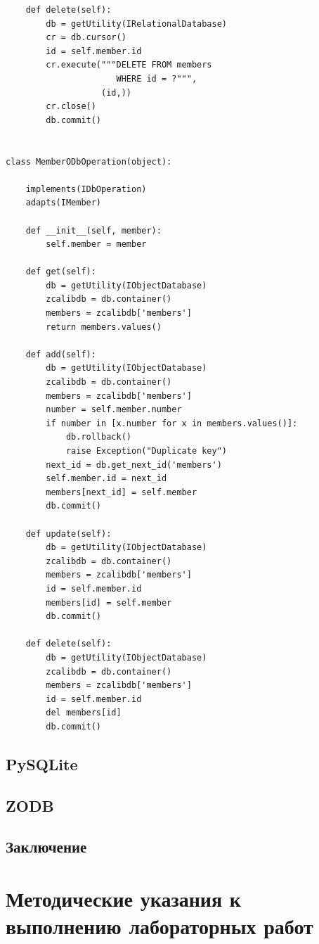 \documentclass[a4paper,openany,twoside,final]{book}
\begin{document}
\begin{verbatim}
    def delete(self):
        db = getUtility(IRelationalDatabase)
        cr = db.cursor()
        id = self.member.id
        cr.execute("""DELETE FROM members
                      WHERE id = ?""",
                   (id,))
        cr.close()
        db.commit()


class MemberODbOperation(object):

    implements(IDbOperation)
    adapts(IMember)

    def __init__(self, member):
        self.member = member

    def get(self):
        db = getUtility(IObjectDatabase)
        zcalibdb = db.container()
        members = zcalibdb['members']
        return members.values()

    def add(self):
        db = getUtility(IObjectDatabase)
        zcalibdb = db.container()
        members = zcalibdb['members']
        number = self.member.number
        if number in [x.number for x in members.values()]:
            db.rollback()
            raise Exception("Duplicate key")
        next_id = db.get_next_id('members')
        self.member.id = next_id
        members[next_id] = self.member
        db.commit()

    def update(self):
        db = getUtility(IObjectDatabase)
        zcalibdb = db.container()
        members = zcalibdb['members']
        id = self.member.id
        members[id] = self.member
        db.commit()

    def delete(self):
        db = getUtility(IObjectDatabase)
        zcalibdb = db.container()
        members = zcalibdb['members']
        id = self.member.id
        del members[id]
        db.commit()
\end{verbatim}


\section{PySQLite%
  \label{pysqlite}%
}


\section{ZODB%
  \label{zodb}%
}

\newpage{}
\section{Заключение%
  \label{id53}%
}

\clearpage
\chapter{Методические указания к выполнению лабораторных работ}
\label{cha:labs}
\end{document}
